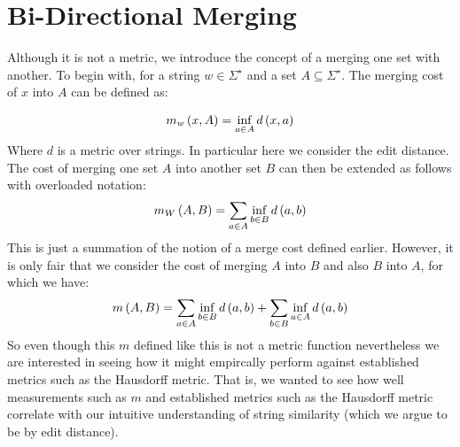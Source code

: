 
\section{Bi-Directional Merging}

Although it is not a metric, we introduce the concept of a merging one
set with another.
To begin with, for a string \(w \in \Sigma^\star\)
and a set \(A \subseteq \Sigma^\star\).
The merging cost of \(x\) into \(A\) can be defined as:

\begin{align*}
  m_w \left(x, A\right) = \inf_{a \in A} d\left(x, a\right)
\end{align*}
Where \(d\) is a metric over strings.
In particular here we consider the edit distance.
The cost of merging one set \(A\)
into another set \(B\) can then be extended as follows
with overloaded notation:
\begin{align*}
  m_W \left(A, B\right) = \sum_{a \in A} \inf_{b \in B} d\left(a, b\right)
\end{align*}
This is just a summation of the notion of a merge cost defined earlier.
However, it is only fair that we consider the cost of merging \(A\) into \(B\)
and also \(B\) into \(A\), for which we have:
\begin{align*}
  m \left(A, B\right) =
      \sum_{a \in A} \inf_{b \in B} d\left(a, b\right) +
      \sum_{b \in B} \inf_{a \in A} d\left(a, b\right)
\end{align*}
So even though this \(m\) defined like this is not a metric function
nevertheless we are interested in seeing how it might empircally perform
against established metrics such as the Hausdorff metric.
That is, we wanted to see how well measurements such as \(m\)
and established metrics such as the Hausdorff metric
correlate with our intuitive understanding of string similarity
(which we argue to be by edit distance).


